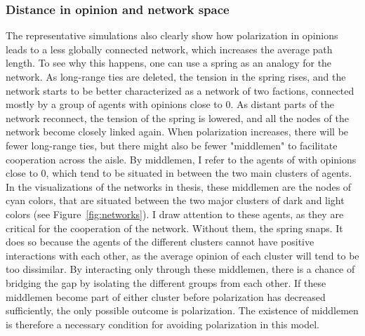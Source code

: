 \documentclass[11pt]{article}
\begin{document}
\subsubsection{Distance in opinion and network space}
\noindent The representative simulations also clearly show how polarization in opinions leads to a less globally connected network, which increases the average path length. To see why this happens, one can use a spring as an analogy for the network. As long-range ties are deleted, the tension in the spring rises, and the network starts to be better characterized as a network of two factions, connected mostly by a group of agents with opinions close to 0. As distant parts of the network reconnect, the tension of the spring is lowered, and all the nodes of the network become closely linked again. When polarization increases, there will be fewer long-range ties, but there might also be fewer "middlemen" to facilitate cooperation across the aisle. By middlemen, I refer to the agents of with opinions close to 0, which tend to be situated in between the two main clusters of agents. In the visualizations of the networks in thesis, these middlemen are the nodes of cyan colors, that are situated between the two major clusters of dark and light colors (see Figure~\ref{fig:networks}). I draw attention to these agents, as they are critical for the cooperation of the network. Without them, the spring snaps. It does so because the agents of the different clusters cannot have positive interactions with each other, as the average opinion of each cluster will tend to be too dissimilar. By interacting only through these middlemen, there is a chance of bridging the gap by isolating the different groups from each other. If these middlemen become part of either cluster before polarization has decreased sufficiently, the only possible outcome is polarization. The existence of middlemen is therefore a necessary condition for avoiding polarization in this model. 
\end{document}

